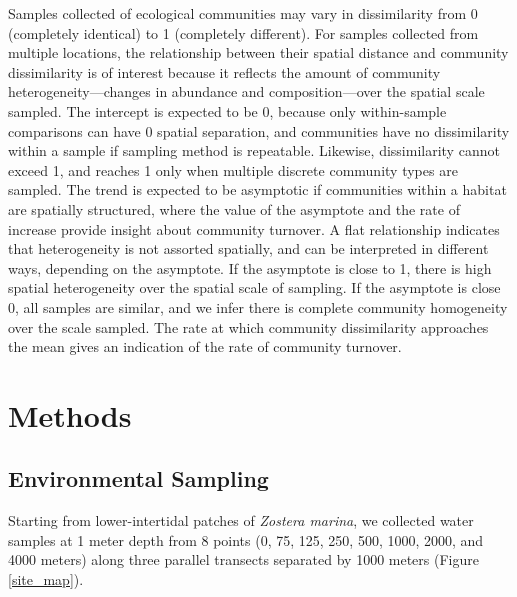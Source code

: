 \documentclass[11pt,letterpaper]{article} %
\begin{document}
Samples collected of ecological communities may vary in dissimilarity from 0 (completely identical) to 1 (completely different).
For samples collected from multiple locations, the relationship between their spatial distance and community dissimilarity is of interest because it reflects the amount of community heterogeneity---changes in abundance and composition---over the spatial scale sampled.
The intercept is expected to be 0, because only within-sample comparisons can have 0 spatial separation, and communities have no dissimilarity within a sample if sampling method is repeatable. %
Likewise, dissimilarity cannot exceed 1, and reaches 1 only when multiple discrete community types are sampled.
The trend is expected to be asymptotic if communities within a habitat are spatially structured, where the value of the asymptote and the rate of increase provide insight about community turnover.
A flat relationship indicates that heterogeneity is not assorted spatially, and can be interpreted in different ways, depending on the asymptote. %
If the asymptote is close to 1, there is high spatial heterogeneity over the spatial scale of sampling.
If the asymptote is close 0, all samples are similar, and we infer there is complete community homogeneity over the scale sampled.
The rate at which community dissimilarity approaches the mean gives an indication of the rate of community turnover.

\section*{Methods}
\subsection*{Environmental Sampling}
Starting from lower-intertidal patches of \textit{Zostera marina}, we collected water samples at 1 meter depth from 8 points (0, 75, 125, 250, 500, 1000, 2000, and 4000 meters) along three parallel transects separated by 1000 meters (Figure \ref{site_map}).
\end{document}

